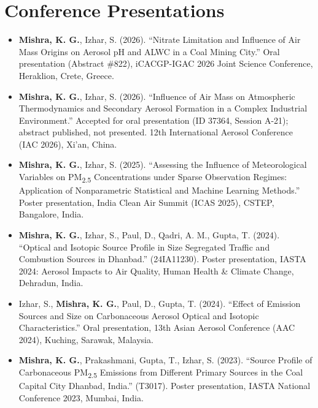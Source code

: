 \documentclass[11pt, a4paper]{article}
\begin{document}
\section*{Conference Presentations}
\begin{itemize}[leftmargin=*]
  \item \textbf{Mishra, K. G.}, Izhar, S. (2026). ``Nitrate Limitation and Influence
  of Air Mass Origins on Aerosol pH and ALWC in a Coal Mining City.'' Oral presentation
  (Abstract \#822), iCACGP-IGAC 2026 Joint Science Conference, Heraklion, Crete, Greece.

  \item \textbf{Mishra, K. G.}, Izhar, S. (2026). ``Influence of Air Mass on Atmospheric
  Thermodynamics and Secondary Aerosol Formation in a Complex Industrial Environment.''
  Accepted for oral presentation (ID 37364, Session A-21); abstract published,
  not presented. 12th International Aerosol Conference (IAC 2026), Xi'an, China.

  \item \textbf{Mishra, K. G.}, Izhar, S. (2025). ``Assessing the Influence of
  Meteorological Variables on PM\textsubscript{2.5} Concentrations under Sparse
  Observation Regimes: Application of Nonparametric Statistical and Machine Learning
  Methods.'' Poster presentation, India Clean Air Summit (ICAS 2025), CSTEP,
  Bangalore, India.

  \item \textbf{Mishra, K. G.}, Izhar, S., Paul, D., Qadri, A. M., Gupta, T. (2024).
  ``Optical and Isotopic Source Profile in Size Segregated Traffic and Combustion
  Sources in Dhanbad.'' (24IA11230). Poster presentation, IASTA 2024: Aerosol Impacts
  to Air Quality, Human Health \& Climate Change, Dehradun, India.

  \item Izhar, S., \textbf{Mishra, K. G.}, Paul, D., Gupta, T. (2024). ``Effect of
  Emission Sources and Size on Carbonaceous Aerosol Optical and Isotopic
  Characteristics.'' Oral presentation, 13th Asian Aerosol Conference (AAC 2024),
  Kuching, Sarawak, Malaysia.

  \item \textbf{Mishra, K. G.}, Prakashmani, Gupta, T., Izhar, S. (2023). ``Source
  Profile of Carbonaceous PM\textsubscript{2.5} Emissions from Different Primary
  Sources in the Coal Capital City Dhanbad, India.'' (T3017). Poster presentation,
  IASTA National Conference 2023, Mumbai, India.
\end{itemize}
\end{document}

